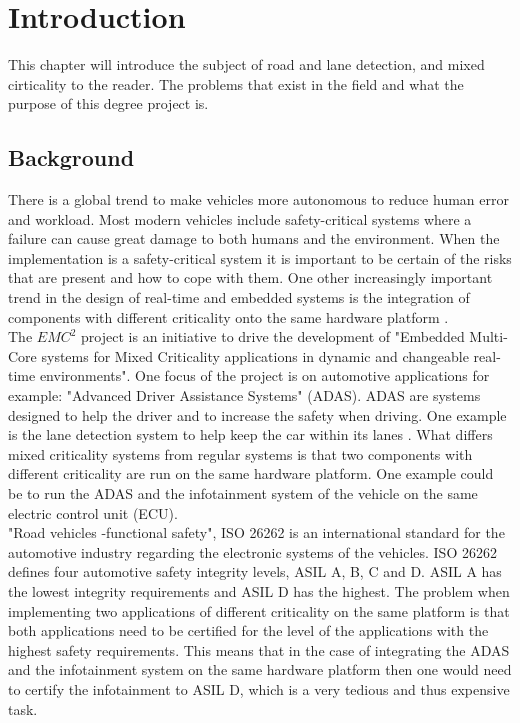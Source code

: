 \chapter{Introduction}
\label{sec:introduction}
This chapter will introduce the subject of road and lane detection, and mixed cirticality to the reader. The problems that exist in the field and what the purpose of this degree project is.


\section{Background}
There is a global trend to make vehicles more autonomous to reduce human error and workload. Most modern vehicles include safety-critical systems where a failure can cause great damage to both humans and the environment. When the implementation is a safety-critical system it is important to be certain of the risks that are present and how to cope with them. One other increasingly important trend in the design of real-time and embedded systems is the integration of components with different criticality onto the same hardware platform \cite{burns2013mixed}.\\

The $EMC^2$ project \cite{eu} is an initiative to drive the development of "Embedded Multi-Core systems for Mixed Criticality applications in dynamic and changeable real-time environments". One focus of the project is on automotive applications for example: "Advanced Driver Assistance Systems" (ADAS). ADAS are systems designed to help the driver and to increase the safety when driving. One example is the lane detection system to help keep the car within its lanes \cite{BarHillel2014}. What differs mixed criticality systems from regular systems is that two components with different criticality are run on the same hardware platform. One example could be to run the ADAS and the infotainment system of the vehicle on the same electric control unit (ECU).\\

"Road vehicles -functional safety", ISO 26262 is an international standard for the automotive industry regarding the electronic systems of the vehicles. ISO 26262 defines four automotive safety integrity levels, ASIL A, B, C and D. ASIL A has the lowest integrity requirements and ASIL D has the highest. The problem when implementing two applications of different criticality on the same platform is that both applications need to be certified for the level of the applications with the highest safety requirements. This means that in the case of integrating the ADAS and the infotainment system on the same hardware platform then one would need to certify the infotainment to ASIL D, which is a very tedious and thus expensive task.\\

